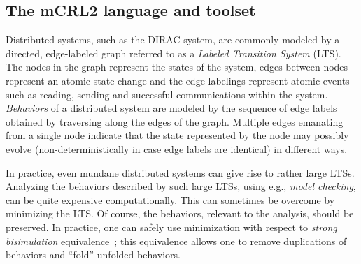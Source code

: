 \documentclass[sort&compress,preprint,3p]{elsarticle}
\begin{document}
\subsection{The mCRL2 language and toolset}

Distributed systems, such as the DIRAC system, are commonly modeled
by a directed, edge-labeled graph referred to as a \emph{Labeled
Transition System} (LTS). The nodes in the graph represent the states
of the system, edges between nodes represent an atomic state change
and the edge labelings represent atomic events such as reading, sending
and successful communications within the system. \emph{Behaviors} of a
distributed system are modeled by the sequence of edge labels obtained
by traversing along the edges of the graph.  Multiple edges emanating
from a single node indicate that the state represented by the node may
possibly evolve (non-deterministically in case edge labels are identical)
in different ways. 

In practice, even mundane distributed systems can give rise to rather
large LTSs. Analyzing the behaviors described by such large LTSs, using
e.g., \emph{model checking},  can be quite expensive computationally.
This can sometimes be overcome by minimizing the LTS. Of course,
the behaviors, relevant to the analysis, should be preserved. In
practice, one can safely use minimization with respect to \emph{strong
bisimulation} equivalence~\cite{Par:81}; this equivalence allows one to
remove duplications of behaviors and ``fold'' unfolded behaviors.
\end{document}

